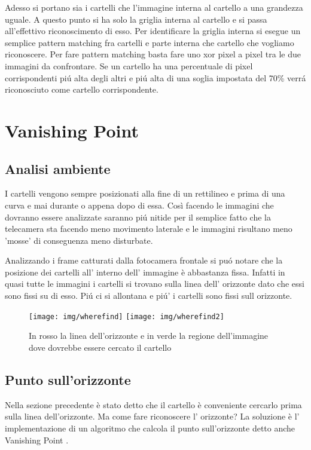 		Adesso si portano sia i cartelli che l'immagine interna al cartello a una grandezza uguale. A questo punto si ha solo la griglia interna al cartello e si passa all'effettivo riconoscimento di esso. Per identificare la griglia interna si esegue un semplice pattern matching fra cartelli e parte interna che cartello che vogliamo riconoscere. Per fare pattern matching basta fare uno xor pixel a pixel tra le due immagini da confrontare. Se un cartello ha una percentuale di pixel corrispondenti pi\'u alta degli altri e pi\'u alta di una soglia impostata del 70\% verr\'a riconosciuto come cartello corrispondente.
		

\section{Vanishing Point}

	\subsection{Analisi ambiente}

		I cartelli vengono sempre posizionati alla fine di un rettilineo e prima di una curva e mai durante o appena dopo di essa. Così facendo le immagini che dovranno essere analizzate saranno pi\'u nitide per il semplice fatto che la telecamera sta facendo meno movimento laterale e le immagini risultano meno 'mosse' di conseguenza meno disturbate.

		Analizzando i frame catturati dalla fotocamera frontale si pu\'o notare che la posizione dei cartelli all' interno dell' immagine è abbastanza fissa. Infatti in quasi tutte le immagini i cartelli si trovano sulla linea dell' orizzonte dato che essi sono fissi su di esso. Pi\'u ci si allontana e pi\'u' i cartelli sono fissi sull orizzonte.
		\begin{figure}[!ht]
			\centering
			\texttt{[image: img/wherefind]}
			\texttt{[image: img/wherefind2]}
			\caption[Area ricerca cartello]{In rosso la linea dell'orizzonte e in verde la regione dell'immagine dove dovrebbe essere cercato il cartello}
		\end{figure}


	\subsection{Punto sull'orizzonte}

		Nella sezione precedente è stato detto che il cartello è conveniente cercarlo prima sulla linea dell'orizzonte. Ma come fare riconoscere l' orizzonte? La soluzione è l' implementazione di un algoritmo che calcola il punto sull'orizzonte detto anche Vanishing Point \cite{vanish}.
		
